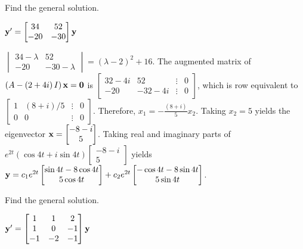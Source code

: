 \documentclass{ximera}
\begin{document}
 \begin{problem}\label{exer:10.6.12}  
 Find the general solution.
 
 $ {\bf
y}'= \begin{bmatrix}34&52\\-20&-30\end{bmatrix}{\bf y}$

\begin{solution}
    $\begin{vmatrix}34-\lambda&52\\-20&-30-\lambda
\end{vmatrix}=(\lambda-2)^2+16$. The augmented matrix of
$\left(A-\left(2+4i\right)I\right){\bf x}={\bf 0}$ is
$ \begin{bmatrix}32-4i&52&\vdots&0\\-20&-32-4i&\vdots&0
 \end{bmatrix}$, which is row equivalent to
$ \begin{bmatrix} 1&(8+i)/5&\vdots&0\\ 0&0&\vdots&0
 \end{bmatrix}$. Therefore,   $x_1=-\frac{(8+i)}{5}x_2$. Taking
$x_2=5$ yields the eigenvector ${\bf
x}= \begin{bmatrix}-8-i\\5 \end{bmatrix}$.
Taking real and imaginary parts of $e^{2t}(\cos4t+i\sin
4t) \begin{bmatrix}-8-i\\5 \end{bmatrix}$ yields ${\bf
y}=c_1e^{2t} \begin{bmatrix}\sin4t-8\cos4t\\
5\cos4t \end{bmatrix}+c_2e^{2t} \begin{bmatrix}
-\cos4t-8\sin4t\\ 5\sin4t \end{bmatrix}$.
\end{solution}
\end{problem}
 


 \begin{problem}\label{exer:10.6.13} 
 Find the general solution.
 
 $ {\bf y}'
= \begin{bmatrix}1&1&2\\1&0&-1\\-1&-2&-1\end{bmatrix}{\bf y}$
\end{problem}
\end{document}
